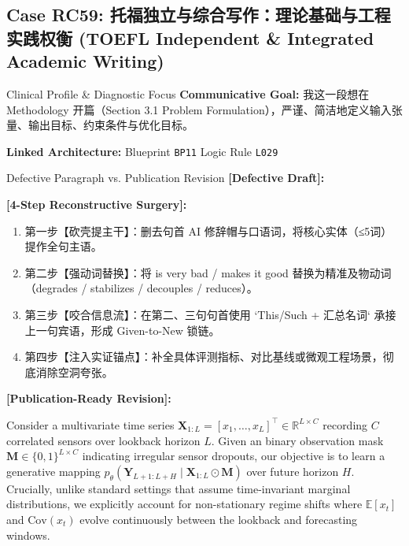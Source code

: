 \subsection{Case RC59: 托福独立与综合写作：理论基础与工程实践权衡 (TOEFL Independent \& Integrated Academic Writing)}\label{case:RC59}
\begin{ConceptBox}{Clinical Profile \& Diagnostic Focus}
\textbf{Communicative Goal:} 我这一段想在 Methodology 开篇（Section 3.1 Problem Formulation），严谨、简洁地定义输入张量、输出目标、约束条件与优化目标。\par
\textbf{Linked Architecture:} Blueprint \texttt{BP11} \enspace\textbar\enspace Logic Rule \texttt{L029}
\end{ConceptBox}
\begin{ExampleBox}{Defective Paragraph vs. Publication Revision}
\textbf{\color{TargetHighlight}[Defective Draft]:}\par
{}\par\vspace{6pt}
\textbf{\color{AcadForest}[4-Step Reconstructive Surgery]:}
\begin{enumerate}[label=\textbf{\color{AcadNavy}Step \arabic*:}, leftmargin=2em]
  \item 第一步【砍壳提主干】：删去句首 AI 修辞帽与口语词，将核心实体（≤5词）提作全句主语。
  \item 第二步【强动词替换】：将 is very bad / makes it good 替换为精准及物动词（degrades / stabilizes / decouples / reduces）。
  \item 第三步【咬合信息流】：在第二、三句句首使用 `This/Such + 汇总名词` 承接上一句宾语，形成 Given-to-New 锁链。
  \item 第四步【注入实证锚点】：补全具体评测指标、对比基线或微观工程场景，彻底消除空洞夸张。
\end{enumerate}\vspace{4pt}
\textbf{\color{AcadNavy}[Publication-Ready Revision]:}\par
Consider a multivariate time series $\mathbf{X}_{1:L} = [x_1, \dots, x_L]^\top \in \mathbb{R}^{L \times C}$ recording $C$ correlated sensors over lookback horizon $L$. Given an binary observation mask $\mathbf{M} \in \{0, 1\}^{L \times C}$ indicating irregular sensor dropouts, our objective is to learn a generative mapping $p_\theta(\mathbf{Y}_{L+1:L+H} \mid \mathbf{X}_{1:L} \odot \mathbf{M})$ over future horizon $H$. Crucially, unlike standard settings that assume time-invariant marginal distributions, we explicitly account for non-stationary regime shifts where $\mathbb{E}[x_t]$ and $\text{Cov}(x_t)$ evolve continuously between the lookback and forecasting windows.
\end{ExampleBox}
